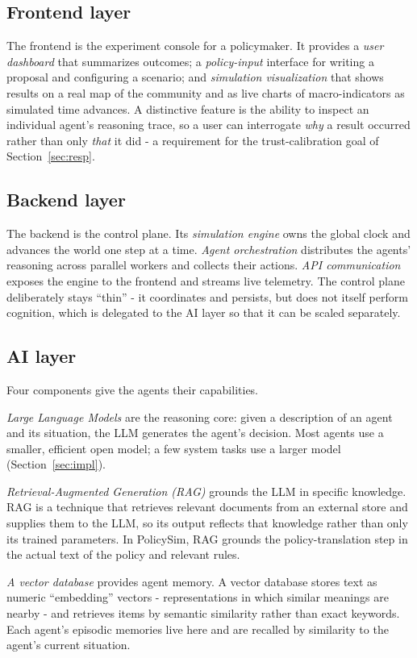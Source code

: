 \documentclass[conference]{IEEEtran}
\begin{document}
\subsection{Frontend layer}
The frontend is the experiment console for a policymaker. It provides a \emph{user dashboard} that summarizes outcomes; a \emph{policy-input} interface for writing a proposal and configuring a scenario; and \emph{simulation visualization} that shows results on a real map of the community and as live charts of macro-indicators as simulated time advances. A distinctive feature is the ability to inspect an individual agent's reasoning trace, so a user can interrogate \emph{why} a result occurred rather than only \emph{that} it did - a requirement for the trust-calibration goal of Section~\ref{sec:resp}.

\subsection{Backend layer}
The backend is the control plane. Its \emph{simulation engine} owns the global clock and advances the world one step at a time. \emph{Agent orchestration} distributes the agents' reasoning across parallel workers and collects their actions. \emph{API communication} exposes the engine to the frontend and streams live telemetry. The control plane deliberately stays ``thin'' - it coordinates and persists, but does not itself perform cognition, which is delegated to the AI layer so that it can be scaled separately.

\subsection{AI layer}
Four components give the agents their capabilities.

\emph{Large Language Models} are the reasoning core: given a description of an agent and its situation, the LLM generates the agent's decision. Most agents use a smaller, efficient open model; a few system tasks use a larger model (Section~\ref{sec:impl}).

\emph{Retrieval-Augmented Generation (RAG)} grounds the LLM in specific knowledge. RAG is a technique that retrieves relevant documents from an external store and supplies them to the LLM, so its output reflects that knowledge rather than only its trained parameters. In PolicySim, RAG grounds the policy-translation step in the actual text of the policy and relevant rules.

\emph{A vector database} provides agent memory. A vector database stores text as numeric ``embedding'' vectors - representations in which similar meanings are nearby - and retrieves items by semantic similarity rather than exact keywords. Each agent's episodic memories live here and are recalled by similarity to the agent's current situation.
\end{document}
